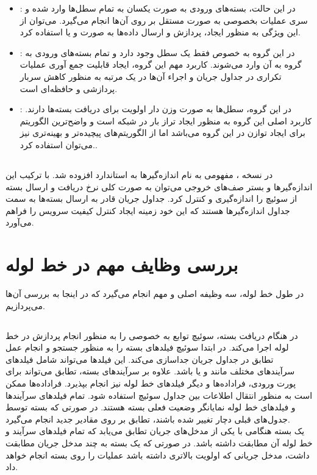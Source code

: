 \begin{itemize}
	\item {}:
در این حالت، بسته‌های ورودی به صورت یکسان به تمام سطل‌ها وارد شده و سری عملیات بخصوصی به صورت مستقل بر روی آن‌ها انجام می‌گیرد. می‌توان از این ویژگی به منظور ایجاد، پردازش و ارسال داده‌ها به صورت  و یا  استفاده کرد.
	\item {}:
در این گروه به خصوص فقط یک سطل وجود دارد و تمام بسته‌های ورودی به گروه به آن وارد می‌شوند. کاربرد مهم این گروه، ایجاد قابلیت جمع آوری عملیات تکراری در جداول جریان و اجراء آن‌ها در یک مرتبه به منظور کاهش سربار پردازشی و حافظه‌ای است.
	\item {}:
در این گروه، سطل‌ها به صورت وزن دار اولویت برای دریافت بسته‌ها دارند. کاربرد اصلی این گروه به منظور ایجاد تراز بار در شبکه است و واضح‌ترین الگوریتم برای ایجاد توازن در این گروه  می‌باشد اما از الگوریتم‌های پیچیده‌تر و بهینه‌تری نیز می‌توان استفاده کرد..
\end{itemize}

\subsection{}
در نسخه ، مفهومی به نام اندازه‌گیر‌ها به استاندارد  افزوده شد. با ترکیب این اندازه‌گیر‌ها و بستر صف‌های خروجی می‌توان به صورت کلی نرخ دریافت و ارسال بسته از سوئیچ را اندازه‌گیری و کنترل کرد. جداول جریان قادر به ارسال بسته‌ها به سمت جداول اندازه‌گیر‌ها هستند که این خود زمینه ایجاد کنترل کیفیت سرویس را فراهم می‌آورد.

\section{بررسی وظایف مهم در خط لوله}
در طول خط لوله، سه وظیفه اصلی و مهم انجام می‌گیرد که در اینجا به بررسی آن‌ها می‌پردازیم.

\subsection{}
در هنگام دریافت بسته، سوئیچ توابع به خصوصی را به منظور انجام پردازش در خط لوله اجرا می‌کند. در ابتدا سوئیچ فیلد‌های بسته را به منظور جستجو و انجام عمل تطابق در جداول جریان جداسازی می‌کند. این فیلد‌ها می‌تواند شامل فیلد‌های سرآیند‌های مختلف مانند  و یا  باشد. علاوه بر سرآیند‌های بسته، تطابق می‌تواند برای پورت ورودی، فراداده‌ها و دیگر فیلد‌های خط لوله نیز انجام بپذیرد. فراداده‌ها ممکن است به منظور انتقال اطلاعات بین جداول سوئیچ استفاده شود. تمام فیلد‌های سرآیند‌ها و فیلد‌های خط لوله نمایانگر وضعیت فعلی بسته هستند. در صورتی که بسته توسط جدول‌های قبلی دچار تغییر شده باشند، تطابق بر روی مقادیر جدید انجام می‌گیرد.\\
یک بسته هنگامی با یکی از مدخل‌های جریان تطابق می‌یابد که تمام فیلد‌های سرآیند و خط لوله آن مطابقت داشته باشد. در صورتی که یک بسته به چند مدخل جریان مطابقت داشت، مدخل جریانی که اولویت بالاتری داشته باشد عملیات را روی بسته انجام خواهد داد.
\pagebreak

